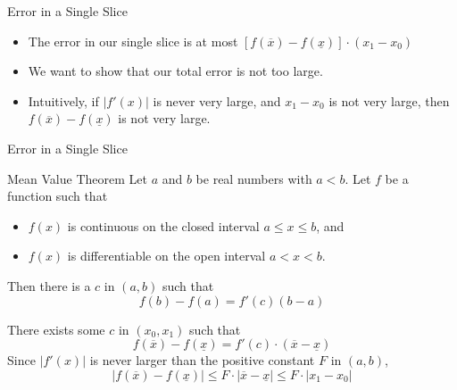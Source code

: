  \begin{frame}{Error in a Single Slice}
\begin{itemize}[<+->]
\item The error in our single slice is at most $\left[f(\overline x)-f(\underline x)\right]\cdot(x_1-x_0)$\vfill
\item We want to show that our total error is not too large.\vfill
\item Intuitively, if $|f'(x)|$ is never very large, and $x_1-x_0$ is not very large, then $f(\overline x)-f(\underline x)$ is not very large.
\end{itemize}
\end{frame}
 \begin{frame}[t]{Error in a Single Slice}
\begin{block}{Mean Value Theorem}
Let $a$ and $b$ be real numbers with $a<b$. Let $f$ be a function such that
\begin{itemize}
\item $f(x)$ is continuous on the closed interval $a \le x \le b$, and
\item $f(x)$ is differentiable on the open interval $a<x<b$.
\end{itemize}
Then there is a $c$ in $(a,b)$ such that
\[ f(b)-f(a) = f'(c)(b-a)\]
\end{block}
There exists some $c$ in $(x_0,x_1)$ such that
\[f(\overline x ) - f(\underline x) = f'(c)\cdot (\overline x-\underline x) \]\pause
Since $|f'(x)|$ is never larger than the positive constant $F$ in $(a,b)$,
\[|f(\overline x ) - f(\underline x) |\leq F\cdot |\overline x-\underline x| \le F \cdot |x_1-x_0| \]


\end{frame}

